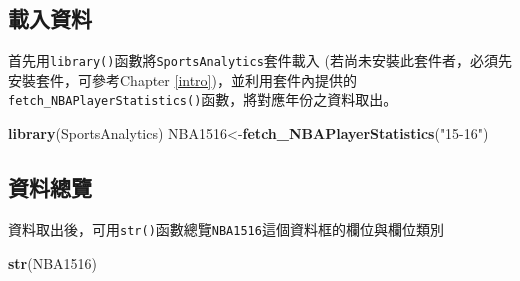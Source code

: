 \documentclass[]{book}
\newenvironment{Shaded}{\begin{snugshade}}{\end{snugshade}}
\newcommand{\KeywordTok}[1]{\textcolor[rgb]{0.13,0.29,0.53}{\textbf{{#1}}}}
\newcommand{\StringTok}[1]{\textcolor[rgb]{0.31,0.60,0.02}{{#1}}}
\newcommand{\NormalTok}[1]{{#1}}
\theoremstyle{definition}
\theoremstyle{definition}
\theoremstyle{remark}
\begin{document}
\subsection{載入資料}

首先用\texttt{library()}函數將\texttt{SportsAnalytics}套件載入
(若尚未安裝此套件者，必須先安裝套件，可參考Chapter
\ref{intro})，並利用套件內提供的\texttt{fetch\_NBAPlayerStatistics()}函數，將對應年份之資料取出。

\begin{Shaded}
\begin{Highlighting}[]
\KeywordTok{library}\NormalTok{(SportsAnalytics)}
\NormalTok{NBA1516<-}\KeywordTok{fetch_NBAPlayerStatistics}\NormalTok{(}\StringTok{"15-16"}\NormalTok{)}
\end{Highlighting}
\end{Shaded}

\subsection{資料總覽}

資料取出後，可用\texttt{str()}函數總覽\texttt{NBA1516}這個資料框的欄位與欄位類別

\begin{Shaded}
\begin{Highlighting}[]
\KeywordTok{str}\NormalTok{(NBA1516)}
\end{Highlighting}
\end{Shaded}
\end{document}

